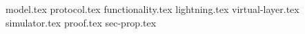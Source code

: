\documentclass{llncs}
\begin{document}
\pagestyle{plain}
{model.tex}
{protocol.tex}
{functionality.tex}
{lightning.tex}
{virtual-layer.tex}
{simulator.tex}
{proof.tex}
{sec-prop.tex}


\end{document}
